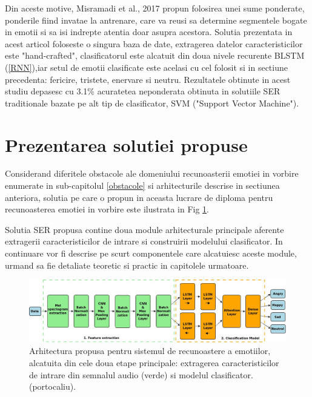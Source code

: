 \documentclass[a4paper,12pt]{book}
\newcounter{Figcount}
\begin{document}
					 Din aceste motive, Misramadi et al., 2017 \cite{misramadi} propun folosirea unei sume ponderate, ponderile fiind invatae la antrenare, care va reusi sa determine segmentele bogate in emotii si sa isi indrepte atentia doar asupra acestora. 					 
					 Solutia prezentata in acest articol foloseste o singura baza de date, extragerea datelor caracteristicilor este "hand-crafted", clasificatorul este alcatuit din doua nivele recurente BLSTM (\ref{RNN}),iar setul de emotii clasificate este acelasi cu cel folosit si in sectiune precedenta: fericire, tristete, enervare si neutru. Rezultatele obtinute in acest studiu depasesc cu 3.1\% acuratetea neponderata obtinuta in solutiile SER traditionale bazate pe alt tip de clasificator, SVM ("Support Vector Machine").
					 
				\section{Prezentarea solutiei propuse} \label{solutie}
					Considerand diferitele obstacole ale domeniului recunoasterii emotiei in vorbire enumerate in sub-capitolul \ref{obstacole} si arhitecturile descrise in sectiunea anteriora, solutia pe care o propun in aceasta lucrare de diploma pentru recunoasterea emotiei in vorbire este ilustrata in Fig \ref{fig:model}. \par
					Solutia SER propusa contine doua module arhitecturale principale aferente extragerii caracteristicilor de intrare si construirii modelului clasificator. In continuare vor fi descrise pe scurt componentele care alcatuiesc aceste module, urmand sa fie detaliate teoretic si practic in capitolele urmatoare. \par
						
					
					\begin{figure}[h]
						\noindent
						\hspace*{-1cm}
						\includegraphics[scale=0.290]{Sistem_Diagram}
						\caption{Arhitectura propusa pentru sistemul de recunoastere a emotiilor, alcatuita din cele doua etape principale: extragerea caracteristicilor de intrare din semnalul audio (verde) si modelul clasificator. (portocaliu).}
						\label{fig:model}
						
					\end{figure}
				
\end{document}
